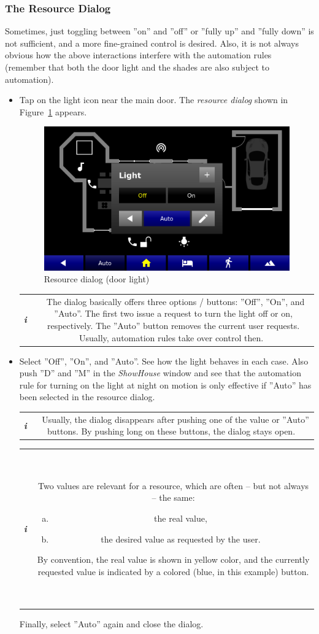 \documentclass[12pt,english,parskip=half,headheight=19pt]{scrreprt}
\newcommand{\infobox}[1]{
  \par
  \medskip
  \hfill
  \setlength\arrayrulewidth{1pt}
  \begin{tabular}[t]{c|c|}
    \parbox{1.8em}{\hfill\textit{\Huge\textbf{i}\,}}
    &
    \,\parbox{0.89\linewidth}{\setlength{\parskip}{0.5em} \small #1}\,
  \end{tabular}
  \medskip
  \par
}
\begin{document}
\subsubsection{The Resource Dialog}

Sometimes, just toggling between ''on'' and ''off'' or ''fully up'' and ''fully down'' is not sufficient,
and a more fine-grained control is desired.
Also, it is not always obvious how the above interactions interfere with the automation rules (remember that
both the door light and the shades are also subject to automation).

\begin{itemize}[$\blacktriangleright$]

  \item
    Tap on the light icon near the main door. The \textit{resource dialog} shown in
    Figure~\ref{fig:tutorial-floorplan-light} appears.

    \begin{figure}[ht]
      \centering
      \includegraphics[width=0.65\linewidth]{figs/wallclock-floorplan-light.png}
      \caption[l]{Resource dialog (door light)}
      \label{fig:tutorial-floorplan-light}
    \end{figure}

    \infobox{
      The dialog basically offers three options / buttons: ''Off'', ''On'', and ''Auto''.
      The first two issue a request to turn the light off or on, respectively. The ''Auto'' button
      removes the current user requests. Usually, automation rules take over control then.
    }

  \item
    Select ''Off'', ''On'', and ''Auto''. See how the light behaves in each case.
    Also push ''D'' and ''M'' in the \textit{ShowHouse} window and see that the automation
    rule for turning on the light at night on motion is only effective if ''Auto'' has
    been selected in the resource dialog.
    \infobox{
      Usually, the dialog disappears after pushing one of the value or ''Auto'' buttons.
      By pushing long on these buttons, the dialog stays open.
    }
    \infobox{
      Two values are relevant for a resource, which are often -- but not always -- the same:
      \begin{enumerate}[a)]
        \item the real value,
        \item the desired value as requested by the user.
      \end{enumerate}
      By convention, the real value is shown in yellow color, and the currently requested value
      is indicated by a colored (blue, in this example) button.
    }
    Finally, select ''Auto'' again and close the dialog.


\end{itemize}
\end{document}
